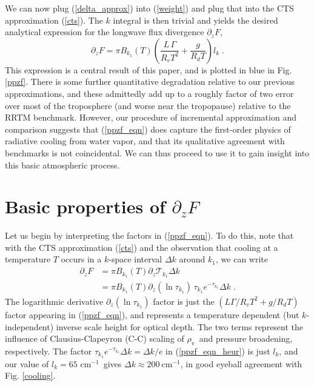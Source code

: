 \documentclass[10pt]{article}
\newcommand{\beqn}{\begin{equation}}
\newcommand{\eeqn}{\end{equation}}
\newcommand{\eqnref}[1]{(\ref{#1})}
\newcommand{\n}{\nonumber}
\newcommand{\ppz}{\ensuremath{\partial_z}}
\newcommand{\FLW}{\ensuremath{F}}
\newcommand{\trans}{\ensuremath{\mathcal{T}}}
\newcommand{\cminverse}{\ensuremath{\mathrm{cm^{-1}}}}
\newcommand{\rhov}{\ensuremath{\rho_\mathrm{v}}}
\begin{document}
We can now plug  \eqnref{delta_approx} into \eqnref{weight} and plug that into the  CTS approximation \eqnref{cts}. The $k$ integral is then trivial and yields the desired analytical expression for the longwave flux divergence $\ppz F$, 
	\beqn
		\ppz \FLW = \pi B_{k_1}(T)\left(\frac{L \, \Gamma}{R_vT^2}+\frac{g}{R_d T} \right)l_k \; .
	\label{ppzf_eqn}
	\eeqn
This expression is a central result of this paper, and is plotted in blue in Fig. \ref{ppzf}. There is some further quantitative degradation relative to our previous approximations, and these admittedly add up to a roughly factor of two error over most of the troposphere (and worse near the tropopause) relative to the RRTM benchmark. However, our procedure of incremental approximation and comparison suggests that \eqnref{ppzf_eqn} does capture the first-order physics of radiative cooling from water vapor, and that its qualitative agreement with benchmarks is not coincidental. We can thus proceed to use it to gain insight into this basic atmospheric process.

\section{Basic properties of $\ppz \FLW$}
	Let us begin by interpreting the factors in \eqnref{ppzf_eqn}. To do this, note that with the CTS approximation \eqnref{cts} and the observation that cooling at a temperature $T$ occurs in a $k$-space interval $\Delta k$ around $k_1$, we can write 
	\begin{align}
		\ppz \FLW & =  \pi B_{k_1}(T) \ppz \trans_{k_1} \Delta k \n \\
				 & =  \pi B_{k_1}(T) \ppz(\ln \tau_{k_1}) \, \tau_{k_1}e^{-\tau_{k_1}} \Delta k \; . 
					\label{ppzf_eqn_heur}
	\end{align}
The logarithmic derivative $\ppz (\ln \tau_{k_1})$ factor is just the $(L\Gamma/R_vT^2+g/R_d T )$ factor appearing in \eqnref{ppzf_eqn}, and represents a temperature dependent (but $k$-independent) inverse scale height for optical depth. The  two terms represent the influence of  Clausius-Clapeyron (C-C) scaling of \rhov\ and pressure broadening, respectively. The factor $\tau_{k_1}e^{-\tau_{k_1}} \Delta k = \Delta k/e$ in \eqnref{ppzf_eqn_heur} is just $l_k$, and our value of $l_k = 65$ \cminverse\ gives $\Delta k \approx 200\ \cminverse$, in good eyeball agreement with Fig. \ref{cooling}.
\end{document}
